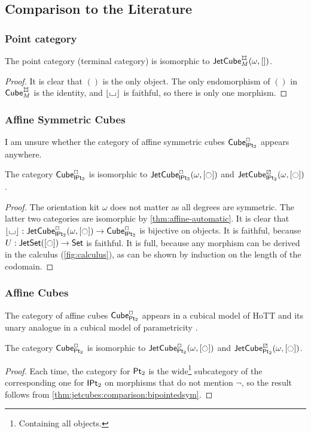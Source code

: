 \documentclass[a4paper]{memoir}
\begin{document}
\subsection{Comparison to the Literature} \label{sec:jetcubes:comparison}
\subsubsection{Point category}
\begin{proposition}
	The point category (terminal category) is isomorphic to $\jetcube{\myorix}{\mycubex}{M}{[]}$.
\end{proposition}
\begin{proof}
	It is clear that $()$ is the only object.
	The only endomorphism of $()$ in $\cubecat^\mycubex_M$ is the identity, and $\mathopen{}\left\lfloor {\llcorner\hspace{-.4ex}\lrcorner} \right\rfloor\mathclose{}$ is faithful, so there is only one morphism.
\end{proof}

\subsubsection{Affine Symmetric Cubes}
I am unsure whether the category of affine symmetric cubes ${\mathsf{Cube}}_{\mathsf{IPt}_2}^\Box$ appears anywhere.
\begin{proposition} \label{thm:jetcubes:comparison:bipointedsym}
	The category ${\mathsf{Cube}}_{\mathsf{IPt}_2}^\Box$ is isomorphic to $\jetcube{\myorix}{\affine}{\bipointedsym}{[\npolar]}$ and $\jetcube{\myorix}{\cartes}{\bipointedsym}{[\npolar]}$.
\end{proposition}
\begin{proof}
	The orientation kit $\omega$ does not matter as all degrees are symmetric.
	The latter two categories are isomorphic by \cref{thm:affine-automatic}.
	It is clear that $\erasejc{\loch} : \jetcube{\myorix}{\affine}{\bipointedsym}{[\npolar]} \to \cubecat_\bipointedsym^\affine$ is bijective on objects.
	It is faithful, because $U : \jetset{[\npolar]} \to \Set$ is faithful.
	It is full, because any morphism can be derived in the calculus (\cref{fig:calculus}), as can be shown by induction on the length of the codomain.
\end{proof}

\subsubsection{Affine Cubes}
The category of affine cubes ${\mathsf{Cube}}_{\mathsf{Pt}_2}^\Box$ appears in a cubical model of HoTT \cite{bch} and its unary analogue in a cubical model of parametricity \cite{bcm}.
\begin{proposition} \label{thm:jetcubes:comparison:bipointed}
	The category ${\mathsf{Cube}}_{\mathsf{Pt}_2}^\Box$ is isomorphic to $\jetcube{\myorix}{\affine}{\bipointed}{[\npolar]}$ and $\jetcube{\myorix}{\cartes}{\bipointed}{[\npolar]}$.
\end{proposition}
\begin{proof}
	Each time, the category for ${\mathsf{Pt}_2}$ is the wide\footnote{Containing all objects.} subcategory of the corresponding one for ${\mathsf{IPt}_2}$ on morphisms that do not mention $\lnot$, so the result follows from \cref{thm:jetcubes:comparison:bipointedsym}.
\end{proof}
\end{document}
